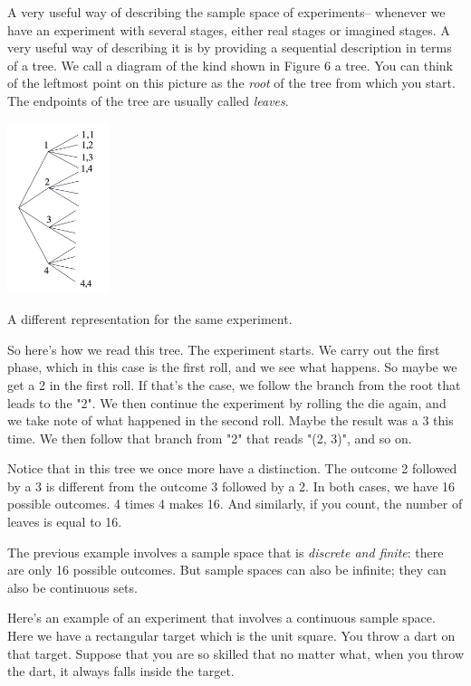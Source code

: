 \documentclass{tufte-handout}
\begin{document}
A very useful way of describing the sample space of experiments-- whenever we have an experiment
with several stages, either real stages or imagined stages. A very useful way of describing it is by
providing a sequential description in terms of a tree. We call a diagram of the kind shown in Figure 6 a 
tree. You can think of the leftmost point on this picture as the \textit{root} of the tree from which 
you start. The endpoints of the tree are usually called \textit{leaves}.

\begin{marginfigure}
  \includegraphics[width=\linewidth, height=5cm]{Dice2Sequential}
  \caption{A different representation for the same experiment.}
  \label{fig:marginfig}
\end{marginfigure}


So here's how we read this tree. The experiment starts. We carry out the first phase, which in this case is the first roll, and we see
what happens. So maybe we get a 2 in the first roll. If that's the case, we follow the branch from the root that leads to the "2". We then continue the experiment by rolling the die again, and we take note of what happened in the
second roll. Maybe the result was a 3 this time. We then follow that branch from "2" that reads "(2, 3)", and so on.

Notice that in this tree we once more have a distinction. The outcome 2 followed by a 3 is
different from the outcome 3 followed by a 2. In both cases, we have 16 possible outcomes. 4 times 4 makes 16. And similarly, if you count, the
number of leaves is equal to 16. 

\vspace{0.7cm}

The previous example involves a sample space that is \textit{discrete and
finite}: there are only 16 possible outcomes. But sample spaces can also be infinite; they can
also be continuous sets.

 Here's an example of an experiment that involves a continuous sample space. Here we have a
rectangular target which is the unit square. You throw a dart on that target. Suppose that you
are so skilled that no matter what, when you throw the dart, it always falls inside the target.
\end{document}
